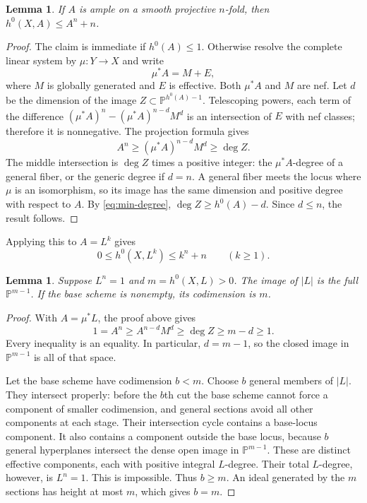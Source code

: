 \documentclass[11pt,reqno,letterpaper]{amsart}
\newcommand{\PP}{\mathbb P}
\newtheorem{lemma}[theorem]{Lemma}
\theoremstyle{definition}
\numberwithin{equation}{section}
\begin{document}
\begin{lemma}\label{lem:sectionbound}
If $A$ is ample on a smooth projective $n$-fold, then
$h^0(X,A)\le A^n+n$.
\end{lemma}
\begin{proof}
The claim is immediate if $h^0(A)\le1$. Otherwise resolve the complete linear
system by $\mu:Y\to X$ and write
\[
 \mu^*A=M+E,
\]
where $M$ is globally generated and $E$ is effective. Both $\mu^*A$ and $M$
are nef. Let $d$ be the dimension of the image
$Z\subset\PP^{h^0(A)-1}$.
Telescoping powers, each term of the difference
$(\mu^*A)^n-(\mu^*A)^{n-d}M^d$ is an intersection of $E$ with nef classes;
therefore it is nonnegative. The projection formula gives
\[
 A^n\ge(\mu^*A)^{n-d}M^d\ge\deg Z.
\]
The middle intersection is $\deg Z$ times a positive integer: the
$\mu^*A$-degree of a general fiber, or the generic degree if $d=n$.
A general fiber meets the locus where $\mu$ is an isomorphism, so its image
has the same dimension and positive degree with respect to $A$.
By \eqref{eq:min-degree}, $\deg Z\ge h^0(A)-d$.
Since $d\le n$, the result follows.
\end{proof}
Applying this to $A=L^k$ gives
\begin{equation}\label{eq:sectionbound}
 0\le h^0(X,L^k)\le k^n+n\qquad(k\ge1).
\end{equation}

\begin{lemma}\label{lem:base}
Suppose $L^n=1$ and $m=h^0(X,L)>0$. The image of $|L|$ is the full
$\PP^{m-1}$. If the base scheme is nonempty, its codimension is $m$.
\end{lemma}
\begin{proof}
With $A=\mu^*L$, the proof above gives
\[
 1=A^n\ge A^{n-d}M^d\ge\deg Z\ge m-d\ge1.
\]
Every inequality is an equality. In particular, $d=m-1$, so the closed
image in $\PP^{m-1}$ is all of that space.

Let the base scheme have codimension $b<m$. Choose $b$ general members of
$|L|$. They intersect properly: before the $b$th cut the base scheme cannot
force a component of smaller codimension, and general sections avoid all
other components at each stage. Their intersection cycle contains a
base-locus component. It also contains a component outside the base locus,
because $b$ general hyperplanes intersect the dense open image in
$\PP^{m-1}$. These are distinct effective components, each with positive
integral $L$-degree. Their total $L$-degree, however, is $L^n=1$.
This is impossible. Thus $b\ge m$. An ideal generated by the $m$ sections
has height at most $m$, which gives $b=m$.
\end{proof}
\end{document}
